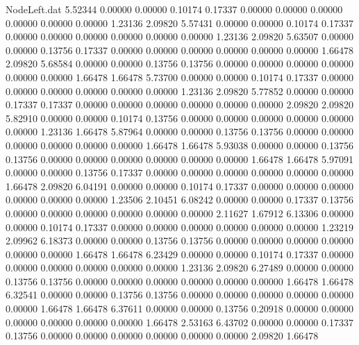 \begin{filecontents}{NodeLeft.dat}
   5.52344    0.00000    0.00000     0.10174    0.17337    0.00000    0.00000    0.00000    0.00000    0.00000    0.00000    1.23136    2.09820
   5.57431    0.00000    0.00000     0.10174    0.17337    0.00000    0.00000    0.00000    0.00000    0.00000    0.00000    1.23136    2.09820
   5.63507    0.00000    0.00000     0.13756    0.17337    0.00000    0.00000    0.00000    0.00000    0.00000    0.00000    1.66478    2.09820
   5.68584    0.00000    0.00000     0.13756    0.13756    0.00000    0.00000    0.00000    0.00000    0.00000    0.00000    1.66478    1.66478
   5.73700    0.00000    0.00000     0.10174    0.17337    0.00000    0.00000    0.00000    0.00000    0.00000    0.00000    1.23136    2.09820
   5.77852    0.00000    0.00000     0.17337    0.17337    0.00000    0.00000    0.00000    0.00000    0.00000    0.00000    2.09820    2.09820
   5.82910    0.00000    0.00000     0.10174    0.13756    0.00000    0.00000    0.00000    0.00000    0.00000    0.00000    1.23136    1.66478
   5.87964    0.00000    0.00000     0.13756    0.13756    0.00000    0.00000    0.00000    0.00000    0.00000    0.00000    1.66478    1.66478
   5.93038    0.00000    0.00000     0.13756    0.13756    0.00000    0.00000    0.00000    0.00000    0.00000    0.00000    1.66478    1.66478
   5.97091    0.00000    0.00000     0.13756    0.17337    0.00000    0.00000    0.00000    0.00000    0.00000    0.00000    1.66478    2.09820
   6.04191    0.00000    0.00000     0.10174    0.17337    0.00000    0.00000    0.00000    0.00000    0.00000    0.00000    1.23506    2.10451
   6.08242    0.00000    0.00000     0.17337    0.13756    0.00000    0.00000    0.00000    0.00000    0.00000    0.00000    2.11627    1.67912
   6.13306    0.00000    0.00000     0.10174    0.17337    0.00000    0.00000    0.00000    0.00000    0.00000    0.00000    1.23219    2.09962
   6.18373    0.00000    0.00000     0.13756    0.13756    0.00000    0.00000    0.00000    0.00000    0.00000    0.00000    1.66478    1.66478
   6.23429    0.00000    0.00000     0.10174    0.17337    0.00000    0.00000    0.00000    0.00000    0.00000    0.00000    1.23136    2.09820
   6.27489    0.00000    0.00000     0.13756    0.13756    0.00000    0.00000    0.00000    0.00000    0.00000    0.00000    1.66478    1.66478
   6.32541    0.00000    0.00000     0.13756    0.13756    0.00000    0.00000    0.00000    0.00000    0.00000    0.00000    1.66478    1.66478
   6.37611    0.00000    0.00000     0.13756    0.20918    0.00000    0.00000    0.00000    0.00000    0.00000    0.00000    1.66478    2.53163
   6.43702    0.00000    0.00000     0.17337    0.13756    0.00000    0.00000    0.00000    0.00000    0.00000    0.00000    2.09820    1.66478

\end{filecontents}
